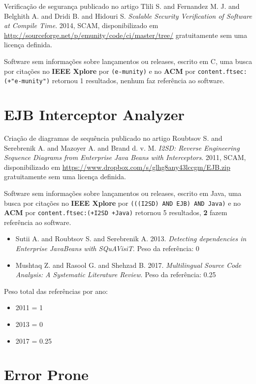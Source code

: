 Verificação de segurança
publicado no artigo
Tlili S. and Fernandez M. J. and Belghith A. and Dridi B. and Hidouri S.
{\it Scalable Security Verification of Software at Compile Time}.
2014,
SCAM,
disponibilizado em \url{http://sourceforge.net/p/emunity/code/ci/master/tree/}
gratuitamente
sem uma licença definida.

Software sem informações sobre lançamentos ou releases,
escrito em C,
uma busca por citações no {\bf IEEE Xplore} por
\texttt{(e-munity)}
e no {\bf ACM} por
\texttt{content.ftsec:(+"e-munity")}
retornou
1 resultados,
nenhum faz referência ao software.


\section{EJB Interceptor Analyzer}

Criação de diagramas de sequência
publicado no artigo
Roubtsov S. and Serebrenik A. and Mazoyer A. and Brand d. v. M.
{\it I2SD: Reverse Engineering Sequence Diagrams from Enterprise Java Beans with Interceptors}.
2011,
SCAM,
disponibilizado em \url{https://www.dropbox.com/s/glhg8any43lccgm/EJB.zip}
gratuitamente
sem uma licença definida.

Software sem informações sobre lançamentos ou releases,
escrito em Java,
uma busca por citações no {\bf IEEE Xplore} por
\texttt{(((I2SD) AND EJB) AND Java)}
e no {\bf ACM} por
\texttt{content.ftsec:(+I2SD +Java)}
retornou
5 resultados,
{\bf 2} fazem referência ao software.

\begin{itemize}
\item Sutii A. and Roubtsov S. and Serebrenik A.
      2013.
      {\it Detecting dependencies in Enterprise JavaBeans with SQuAVisiT}.
      Peso da referência: 0
\item Mushtaq Z. and Rasool G. and Shehzad B.
      2017.
      {\it Multilingual Source Code Analysis: A Systematic Literature Review}.
      Peso da referência: 0.25
\end{itemize}

Peso total das referências por ano:

\begin{itemize}
\item 2011 = 1
\item 2013 = 0
\item 2017 = 0.25
\end{itemize}


\section{Error Prone}

